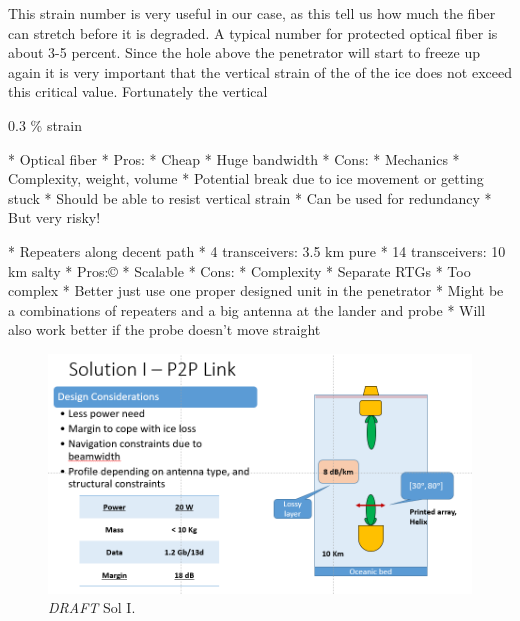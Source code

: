 This strain number is very useful in our case, as this tell us how much the fiber can stretch before it is degraded. A typical number for protected optical fiber is about 3-5 percent\cite{article:optical_fiber_properties,article:optical_fiber_mechanical}. Since the hole above the penetrator will start to freeze up again it is very important that the vertical strain of the of the ice does not exceed this critical value. Fortunately the vertical 

0.3 \% strain

\cite[p. 76]{book:communication}


* Optical fiber
	* Pros:
		* Cheap
		* Huge bandwidth
	* Cons:
		* Mechanics %
			* Complexity, weight, volume
		* Potential break due to ice movement or getting stuck
	* Should be able to resist vertical strain
	* Can be used for redundancy
		* But very risky!



* Repeaters along decent path
	* 4 transceivers: 3.5 km pure
	* 14 transceivers: 10 km salty
	* Pros:©
		* Scalable
	* Cons:
		* Complexity
		* Separate RTGs
	* Too complex
		* Better just use one proper designed unit in the penetrator
		* Might be a combinations of repeaters and a big antenna at the lander and probe
		* Will also work better if the probe doesn't move straight

\begin{figure}[htb]
	\centering
	\includegraphics[width=\textwidth]{figures/comms/iceLink-p2p-HighD}
	\caption{ \textit{DRAFT} Sol I.}
	\label{fig:iceLink-p2p-HighD}
\end{figure}


